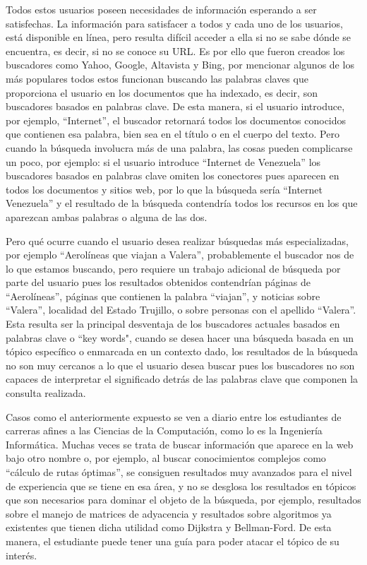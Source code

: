 Todos estos usuarios poseen necesidades de información esperando a ser satisfechas. La información para satisfacer a todos y cada uno de los usuarios, está disponible en línea, pero resulta difícil acceder a ella si no se sabe dónde se encuentra, es decir, si no se conoce su URL. Es por ello que fueron creados los buscadores como Yahoo, Google, Altavista y Bing, por mencionar algunos de los más populares todos estos funcionan buscando las palabras claves que proporciona el usuario en los documentos que ha indexado, es decir, son buscadores basados en palabras clave. De esta manera, si el usuario introduce, por ejemplo, ``Internet”, el buscador retornará todos los documentos conocidos que contienen esa palabra, bien sea en el título o en el cuerpo del texto. Pero cuando la búsqueda involucra más de una palabra, las cosas pueden complicarse un poco, por ejemplo: si el usuario introduce ``Internet de Venezuela” los buscadores basados en palabras clave omiten los conectores pues aparecen en todos los documentos y sitios web, por lo que la búsqueda sería ``Internet Venezuela” y el resultado de la búsqueda contendría todos los recursos en los que aparezcan ambas palabras o alguna de las dos.

Pero qué ocurre cuando el usuario desea realizar búsquedas más especializadas, por ejemplo ``Aerolíneas que viajan a Valera”, probablemente el buscador nos de lo que estamos buscando, pero requiere un trabajo adicional de búsqueda por parte del usuario pues los resultados obtenidos contendrían páginas de ``Aerolíneas”, páginas que contienen la palabra ``viajan”, y noticias sobre ``Valera”, localidad del Estado Trujillo, o sobre personas con el apellido ``Valera”. Esta resulta ser la principal desventaja de los buscadores actuales basados en palabras clave o ``key words", cuando se desea hacer una búsqueda basada en un tópico específico o enmarcada en un contexto dado, los resultados de la búsqueda no son muy cercanos a lo que el usuario desea buscar pues los buscadores no son capaces de interpretar el significado detrás de las palabras clave que componen la consulta realizada.

Casos como el anteriormente expuesto se ven a diario entre los estudiantes de carreras afines a las Ciencias de la Computación, como lo es la Ingeniería Informática. Muchas veces se trata de buscar información que aparece en la web bajo otro nombre o, por ejemplo, al buscar conocimientos complejos como ``cálculo de rutas óptimas”, se consiguen resultados muy avanzados para el nivel de experiencia que se tiene en esa área, y no se desglosa los resultados en tópicos que son necesarios para dominar el objeto de la búsqueda, por ejemplo, resultados sobre el manejo de matrices de adyacencia y resultados sobre algoritmos ya existentes que tienen dicha utilidad como Dijkstra y Bellman-Ford. De esta manera, el estudiante puede tener una guía para poder atacar el tópico de su interés.


